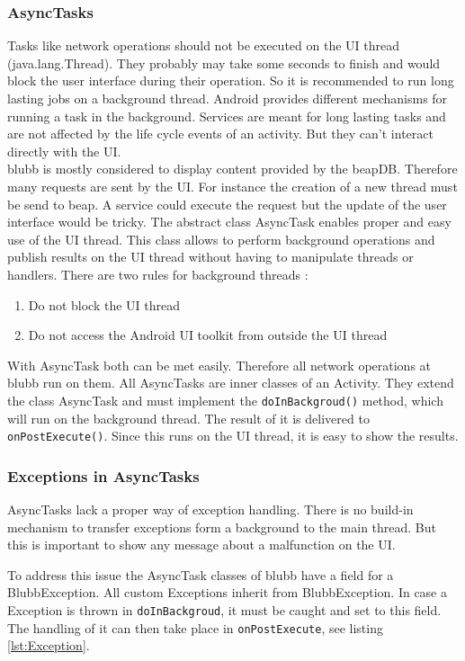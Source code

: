 \documentclass[12pt,a4paper,oneside]{report}
\newcommand{\appname}{blubb}
\newcommand{\beapDB}{beapDB}
\newcommand{\code}[1]{\lstinline{#1}}
\begin{document}
\subsubsection{AsyncTasks}
Tasks like network operations should not be executed on the UI thread (java.lang.Thread). They probably may take some seconds to finish and would block the user interface during their operation. So it is recommended to run long lasting jobs on a background thread. 
Android provides different mechanisms for running a task in the background.
Services are meant for long lasting tasks and are not affected by the life cycle events of an activity. But they can't interact directly with the UI. \\
\appname{} is mostly considered to display content provided by the \beapDB{}. Therefore many requests are sent by the UI. For instance the creation of a new thread must be send to beap. A service could execute the request but the update of the user interface would be tricky. The abstract class AsyncTask enables proper and easy use of the UI thread. This class allows to perform background operations and publish results on the UI thread without having to manipulate threads or handlers\citep{aDefAsyncTask}.
There are two rules for background threads
\citep{aDefProcThreads}:
\begin{enumerate}
	\item Do not block the UI thread
	\item Do not access the Android UI toolkit from outside the UI thread
\end{enumerate}
With AsyncTask both can be met easily. Therefore all network operations at \appname{} run on them. All AsyncTasks are inner classes of an Activity. They extend the class AsyncTask and must implement the \code{doInBackgroud()} method, which will run on the background thread. The result of it is delivered to \code{onPostExecute()}. Since this runs on the UI thread, it is easy to show the results.

\subsubsection{Exceptions in AsyncTasks}
AsyncTasks lack a proper way of exception handling. There is no build-in mechanism to transfer exceptions form a background to the main thread. But this is important to show any message about a malfunction on the UI.

 To address this issue the AsyncTask classes of \appname{} have a field for a BlubbException. All custom Exceptions inherit from BlubbException. In case a Exception is thrown in \code{doInBackgroud}, it must be caught and set to this field. The handling of it can then take place in \code{onPostExecute}, see listing \ref{lst:Exception}.
\end{document}
